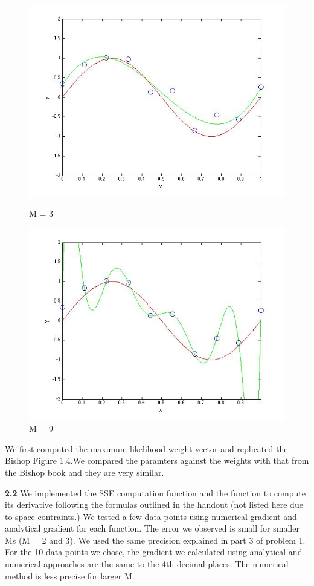 \begin{figure}[!htb]
  \includegraphics[width=\linewidth]{figures/p2_MLE_M=3}
  \caption{M = 3}\label{fig:figures/p2_M=3}
\endminipage\hfill
{}                                                                            
  \includegraphics[width=\linewidth]{figures/p2_MLE_M=9}
  \caption{M = 9}\label{fig:figures/p2_M=9}
\endminipage\hfill
\end{figure}

We first computed the maximum likelihood weight vector and replicated 
the Bishop Figure 1.4.We compared the paramters against the weights with that from the Bishop book and they are very similar. 



{\bfseries 2.2}
We implemented the SSE computation function and the function to compute its derivative following the formulas outlined in the handout (not listed here due to space contraints.)
We tested a few data points using numerical gradient and analytical gradient for each function.
The error we observed is small for smaller Ms (M = 2 and 3).  We used the same precision explained
 in part 3 of problem 1. For the 10 data points we chose, the gradient we calculated using analytical and numerical approaches are the same to the 4th decimal places. The numerical method is less precise for larger M. 

